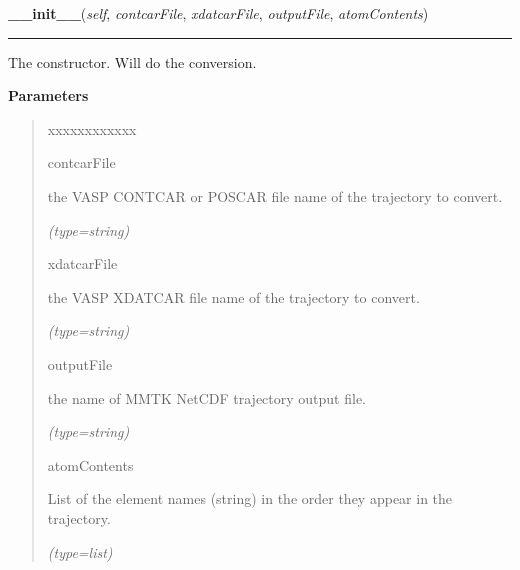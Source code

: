\hspace{.8\funcindent}\begin{boxedminipage}{\funcwidth}

    \raggedright \textbf{\_\_init\_\_}(\textit{self}, \textit{contcarFile}, \textit{xdatcarFile}, \textit{outputFile}, \textit{atomContents})

    \vspace{-1.5ex}

    \rule{\textwidth}{0.5\fboxrule}
\setlength{\parskip}{2ex}
    The constructor. Will do the conversion.

\setlength{\parskip}{1ex}
      \textbf{Parameters}
      \vspace{-1ex}

      \begin{quote}
        \begin{Ventry}{xxxxxxxxxxxx}

          \item[contcarFile]

          the VASP CONTCAR or POSCAR file name of the trajectory to 
          convert.

            {\it (type=string)}

          \item[xdatcarFile]

          the VASP XDATCAR file name of the trajectory to convert.

            {\it (type=string)}

          \item[outputFile]

          the name of MMTK NetCDF trajectory output file.

            {\it (type=string)}

          \item[atomContents]

          List of the element names (string) in the order they appear in 
          the trajectory.

            {\it (type=list)}

        \end{Ventry}

      \end{quote}

    \end{boxedminipage}

